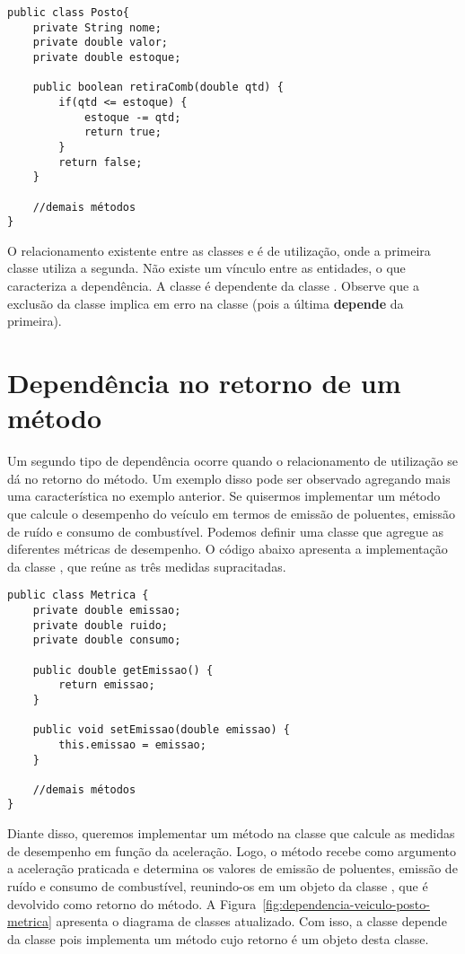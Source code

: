 \begin{verbatim}
public class Posto{
	private String nome;
	private double valor;
	private double estoque;

	public boolean retiraComb(double qtd) {
		if(qtd <= estoque) {
			estoque -= qtd;
			return true;
		}
		return false;
	}
	
	//demais métodos
}
\end{verbatim}

O relacionamento existente entre as classes  e  é de utilização, onde a primeira classe utiliza a segunda. Não existe um vínculo entre as entidades, o que caracteriza a dependência. A classe  é dependente da classe . Observe que a exclusão da classe  implica em erro na classe  (pois a última \textbf{depende} da primeira).

\section{Dependência no retorno de um método}

Um segundo tipo de dependência ocorre quando o relacionamento de utilização se dá no retorno do método. Um exemplo disso pode ser observado agregando mais uma característica no exemplo anterior. Se quisermos implementar um método que calcule o desempenho do veículo em termos de emissão de poluentes, emissão de ruído e consumo de combustível. Podemos definir uma classe que agregue as diferentes métricas de desempenho. O código abaixo apresenta a implementação da classe , que reúne as três medidas supracitadas.

\begin{verbatim}
public class Metrica {
	private double emissao;
	private double ruido;
	private double consumo;
	
	public double getEmissao() {
		return emissao;
	}
	
	public void setEmissao(double emissao) {
		this.emissao = emissao;
	}
	
	//demais métodos
}
\end{verbatim}

Diante disso, queremos implementar um método na classe  que calcule as medidas de desempenho em função da aceleração. Logo, o método  recebe como argumento a aceleração praticada e determina os valores de emissão de poluentes, emissão de ruído e consumo de combustível, reunindo-os em um objeto da classe , que é devolvido como retorno do método. A Figura~\ref{fig:dependencia-veiculo-posto-metrica} apresenta o diagrama de classes atualizado. Com isso, a classe  depende da classe  pois implementa um método cujo retorno é um objeto desta classe.

